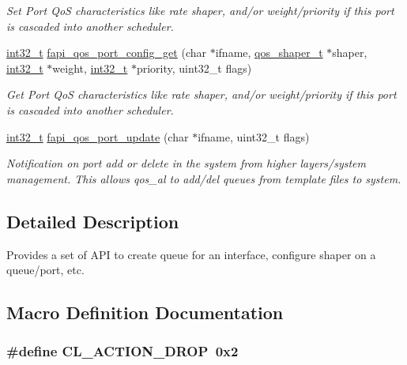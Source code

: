 \begin{DoxyCompactItemize}
\begin{DoxyCompactList}\small\item\em Set Port Qo\-S characteristics like rate shaper, and/or weight/priority if this port is cascaded into another scheduler. \end{DoxyCompactList}\item 
\hyperlink{commondefs_8h_a32f2e37ee053cf2ce8ca28d1f74630e5}{int32\-\_\-t} \hyperlink{group__FAPI__QOS__QUEUE_gaa91cdf232e5ee1ffb8c0c501c743c694}{fapi\-\_\-qos\-\_\-port\-\_\-config\-\_\-get} (char $\ast$ifname, \hyperlink{group__FAPI__QOS__QUEUE_ga05ce7ada7ae20b289d4e675ad099c8f0}{qos\-\_\-shaper\-\_\-t} $\ast$shaper, \hyperlink{commondefs_8h_a32f2e37ee053cf2ce8ca28d1f74630e5}{int32\-\_\-t} $\ast$weight, \hyperlink{commondefs_8h_a32f2e37ee053cf2ce8ca28d1f74630e5}{int32\-\_\-t} $\ast$priority, uint32\-\_\-t flags)
\begin{DoxyCompactList}\small\item\em Get Port Qo\-S characteristics like rate shaper, and/or weight/priority if this port is cascaded into another scheduler. \end{DoxyCompactList}\item 
\hyperlink{commondefs_8h_a32f2e37ee053cf2ce8ca28d1f74630e5}{int32\-\_\-t} \hyperlink{group__FAPI__QOS__QUEUE_ga10ae649e4e386857ad8cadeb7e2e2e41}{fapi\-\_\-qos\-\_\-port\-\_\-update} (char $\ast$ifname, uint32\-\_\-t flags)
\begin{DoxyCompactList}\small\item\em Notification on port add or delete in the system from higher layers/system management. This allows qos\-\_\-al to add/del queues from template files to system. \end{DoxyCompactList}\end{DoxyCompactItemize}


\subsection{Detailed Description}
Provides a set of A\-P\-I to create queue for an interface, configure shaper on a queue/port, etc. 

\subsection{Macro Definition Documentation}
\hypertarget{group__FAPI__QOS__QUEUE_gaba07a1aea72eb2747e5b5328219a135a}{
\subsubsection[{C\-L\-\_\-\-A\-C\-T\-I\-O\-N\-\_\-\-D\-R\-O\-P}]{\setlength{\rightskip}{0pt plus 5cm}\#define C\-L\-\_\-\-A\-C\-T\-I\-O\-N\-\_\-\-D\-R\-O\-P~0x2}}\label{group__FAPI__QOS__QUEUE_gaba07a1aea72eb2747e5b5328219a135a}


